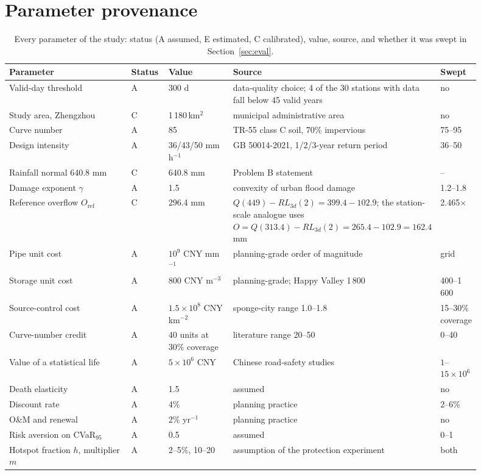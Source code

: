 \section{Parameter provenance}\label{app:params}

\begin{table}[H]
\centering
\caption{Every parameter of the study: status (A assumed, E estimated, C calibrated), value, source, and whether it was swept in Section~\ref{sec:eval}.}
\label{tab:params}
\footnotesize
\setlength{\tabcolsep}{4pt}
\begin{tabular}{@{}p{0.30\linewidth}p{0.08\linewidth}p{0.15\linewidth}p{0.31\linewidth}p{0.06\linewidth}@{}}
\toprule
Parameter & Status & Value & Source & Swept\\
\midrule
Valid-day threshold & A & 300 d & data-quality choice; 4 of the 30 stations with data fall below 45 valid years & no\\
Study area, Zhengzhou & C & 1\,180\,km$^2$ & municipal administrative area & no\\
Curve number & A & 85 & TR-55 class C soil, 70\% impervious & 75--95\\
Design intensity & A & 36/43/50 mm h$^{-1}$ & GB 50014-2021, 1/2/3-year return period & 36--50\\
Rainfall normal 640.8 mm & C & 640.8 mm & Problem B statement & --\\
Damage exponent $\gamma$ & A & 1.5 & convexity of urban flood damage & 1.2--1.8\\
Reference overflow $O_{\text{ref}}$ & C & 296.4 mm & $Q(449)-RL_{3d}(2)=399.4-102.9$; the station-scale analogue uses $O=Q(313.4)-RL_{3d}(2)=265.4-102.9=162.4$ mm & 2.465$\times$\\
Pipe unit cost & A & $10^{9}$ CNY mm$^{-1}$ & planning-grade order of magnitude & grid\\
Storage unit cost & A & 800 CNY m$^{-3}$ & planning-grade; Happy Valley 1\,800 & 400--1\,600\\
Source-control cost & A & $1.5\times10^{8}$ CNY km$^{-2}$ & sponge-city range 1.0--1.8 & 15--30\% coverage\\
Curve-number credit & A & 40 units at 30\% coverage & literature range 20--50 & 0--40\\
Value of a statistical life & A & $5\times10^{6}$ CNY & Chinese road-safety studies & $1$--$15\times10^{6}$\\
Death elasticity & A & 1.5 & assumed & no\\
Discount rate & A & 4\% & planning practice & 2--6\%\\
O\&M and renewal & A & 2\% yr$^{-1}$ & planning practice & no\\
Risk aversion on CVaR$_{95}$ & A & 0.5 & assumed & 0--1\\
Hotspot fraction $h$, multiplier $m$ & A & 2--5\%, 10--20 & assumption of the protection experiment & both\\
\bottomrule
\end{tabular}
\end{table}

